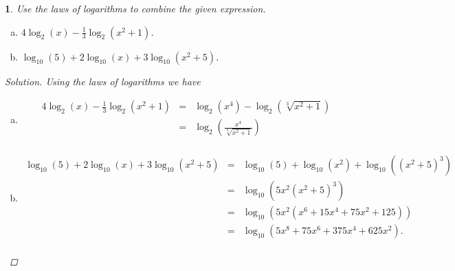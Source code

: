 \documentclass[12pt]{amsart}
\newtheorem{thm}{}
\begin{document}
\setcounter{thm}{19} 
\begin{thm}
  Use the laws of logarithms to combine the given expression.
  \begin{enumerate}[(a)]
  \item
    $4\log_2(x) - \frac{1}{3}\log_2(x^2 + 1)$.
  \item
    $\log_{10}(5) + 2\log_{10}(x) + 3\log_{10}(x^2 + 5)$.
  \end{enumerate}

  \begin{proof}[Solution]
    Using the laws of logarithms we have
    \begin{enumerate}[(a)]
    \item
      \begin{eqnarray*}
        4\log_2(x) - \frac{1}{3}\log_2(x^2 + 1) &=& \log_2(x^4) - \log_2(\sqrt[3]{x^2 + 1})\\
        &=& \log_2(\frac{x^4}{\sqrt[3]{x^2 + 1}})\\
      \end{eqnarray*}
    \item
      \begin{eqnarray*}
        \log_{10}(5) + 2\log_{10}(x) + 3\log_{10}(x^2 + 5) &=& \log_{10}(5) + \log_{10}(x^2) + \log_{10}((x^2 + 5)^3)\\
        &=& \log_{10}(5x^2(x^2 + 5)^3)\\
        &=& \log_{10}(5x^2(x^6 + 15x^4 + 75x^2 + 125))\\
        &=& \log_{10}(5x^8 + 75x^6 + 375x^4 + 625x^2).\\
      \end{eqnarray*}
    \end{enumerate}
  \end{proof}
\end{thm}
\end{document}
